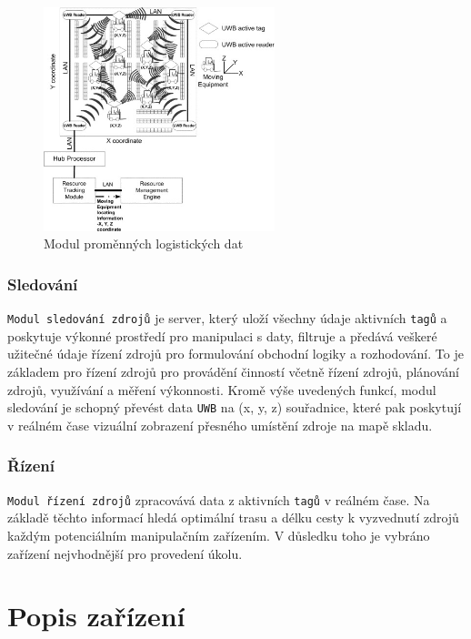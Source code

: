 \documentclass[czech,BP]{thesiskiv}
\begin{document}
\begin{figure}[ht]
		\centering
		\includegraphics[width=0.6\textwidth]{../images/uwb.jpg}	
		\caption{Modul proměnných logistických dat\cite{chow2006design}}
		\label{fig:uwb}
\end{figure}




\subsection{Sledování}
\texttt{Modul sledování zdrojů} je server, který uloží všechny údaje aktivních \texttt{tagů} a poskytuje výkonné prostředí pro manipulaci s daty, filtruje a předává veškeré užitečné údaje řízení zdrojů pro formulování obchodní logiky a rozhodování. To je základem pro řízení zdrojů pro provádění činností včetně řízení zdrojů, plánování zdrojů, využívání a měření výkonnosti. Kromě výše uvedených funkcí, modul sledování je schopný převést data \texttt{UWB} na (x, y, z) souřadnice, které pak poskytují v reálném čase vizuální zobrazení přesného umístění zdroje na mapě skladu.\cite{chow2006design}

\subsection{Řízení}
\texttt{Modul řízení zdrojů} zpracovává data z aktivních \texttt{tagů} v reálném čase. Na základě těchto informací hledá optimální trasu a délku cesty k vyzvednutí zdrojů každým potenciálním manipulačním zařízením. V důsledku toho je vybráno zařízení nejvhodnější pro provedení úkolu.\cite{chow2006design}
	


\chapter{Popis zařízení}
\end{document}
